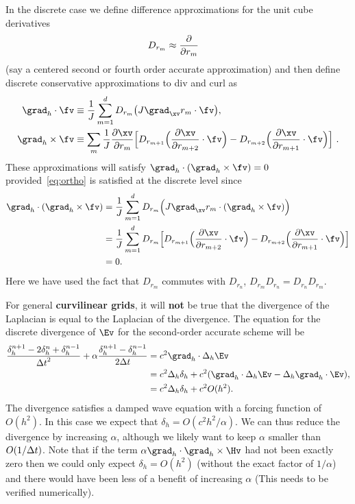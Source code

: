 In the discrete case we define difference approximations for the unit cube derivatives
\begin{align*}
  D_{r_m} &\approx {\partial\over \partial r_m} 
\end{align*}
(say a centered second or fourth order accurate approximation) and
then define discrete conservative approximations to div and curl as
\begin{align*}
  \grad_h\cdot\fv &\equiv {1\over J}\sum_{m=1}^{d} D_{r_m}\big( J\grad_\xv r_m \cdot \fv\big),\\
  \grad_h\times\fv  &\equiv \sum_m \frac{1}{J} {\partial\xv\over\partial r_{m}}
                           \Big[ D_{r_{m+1}} \Big( {\partial\xv\over\partial r_{m+2}} \cdot\fv \Big) -
                                 D_{r_{m+2}} \Big( {\partial\xv\over\partial r_{m+1}} \cdot\fv \Big) \Big] ~.
\end{align*}
These approximations will satisfy $\grad_h\cdot(\grad_h\times\fv)=0$ provided~\eqref{eq:ortho} is
satisfied at the discrete level since 
\begin{align*}
  \grad_h\cdot(\grad_h\times\fv) &= 
           {1\over J}\sum_{m=1}^{d} D_{r_m}\Big( J\grad_\xv r_m \cdot (\grad_h\times\fv)\Big)\\
   &= {1\over J}\sum_{m=1}^{d} 
         D_{r_m}\Big[ D_{r_{m+1}}\Big( {\partial\xv\over\partial r_{m+2}}\cdot\fv \Big) -
                      D_{r_{m+2}}\Big( {\partial\xv\over\partial r_{m+1}}\cdot\fv \Big) \Big] \\
      &= 0 .
\end{align*}
Here we have used the fact that $D_{r_m}$ commutes with $D_{r_n}$, $D_{r_m}D_{r_n} = D_{r_n}D_{r_m}$. 

For general {\bf curvilinear grids}, it will {\bf not} be true that the divergence of the Laplacian is equal to
the Laplacian of the divergence. The equation for the discrete divergence of $\Ev$ for
the second-order accurate scheme will be 
\begin{align*}
{\delta_{h}^{n+1} - 2\delta_{h}^{n} + \delta_{h}^{n-1} \over \dt^2 }
  + \alpha {\delta_{h}^{n+1} -  \delta_{h}^{n-1} \over 2 \dt } &= 
                c^2 \grad_{h}\cdot\Delta_{h} \Ev \\
   & = c^2 \Delta_{h}\delta_{h} + c^2 (\grad_{h}\cdot\Delta_{h} \Ev - \Delta_{h}\grad_{h}\cdot \Ev), \\
   & = c^2 \Delta_{h}\delta_{h} + c^2 O( h^2 ) .
\end{align*}
The divergence satisfies a damped wave equation with a forcing function of $O( h^2 )$.
In this case we expect that $\delta_{h} = O(c^2 h^2/\alpha)$. We can thus reduce the divergence by increasing $\alpha$,
although we likely want to keep $\alpha$ smaller than $O(1/{\Delta t})$. 
Note that if the term $\alpha\grad_{h}\cdot\grad_h\times\Hv$ had not been exactly zero then we could only expect
 $\delta_{h} = O(h^2)$ (without the exact factor of $1/\alpha$) and there would have been less of a benefit of
increasing $\alpha$ (This needs to be verified numerically).


